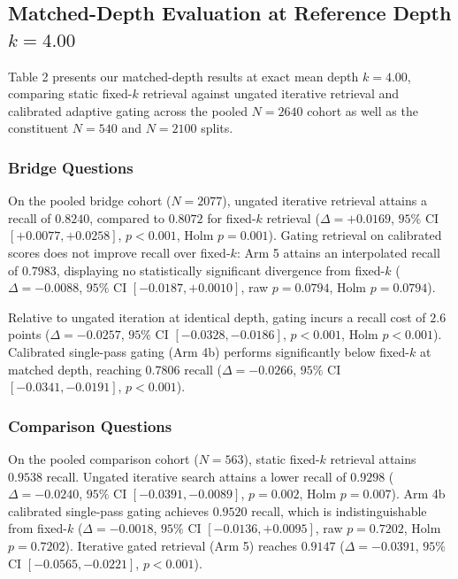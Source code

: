 \documentclass{article}
\begin{document}
\subsection{Matched-Depth Evaluation at Reference Depth $k=4.00$}
Table 2 presents our matched-depth results at exact mean depth $k=4.00$, comparing static fixed-$k$ retrieval against ungated iterative retrieval and calibrated adaptive gating across the pooled $N=2640$ cohort as well as the constituent $N=540$ and $N=2100$ splits.

\subsubsection{Bridge Questions}
On the pooled bridge cohort ($N=2077$), ungated iterative retrieval attains a recall of $0.8240$, compared to $0.8072$ for fixed-$k$ retrieval ($\Delta = +0.0169$, $95\%$ CI $[+0.0077, +0.0258]$, $p < 0.001$, Holm $p=0.001$). Gating retrieval on calibrated scores does not improve recall over fixed-$k$: Arm 5 attains an interpolated recall of $0.7983$, displaying no statistically significant divergence from fixed-$k$ ($\Delta = -0.0088$, $95\%$ CI $[-0.0187, +0.0010]$, raw $p = 0.0794$, Holm $p = 0.0794$).

Relative to ungated iteration at identical depth, gating incurs a recall cost of $2.6$ points ($\Delta = -0.0257$, $95\%$ CI $[-0.0328, -0.0186]$, $p < 0.001$, Holm $p < 0.001$). Calibrated single-pass gating (Arm 4b) performs significantly below fixed-$k$ at matched depth, reaching $0.7806$ recall ($\Delta = -0.0266$, $95\%$ CI $[-0.0341, -0.0191]$, $p < 0.001$).

\subsubsection{Comparison Questions}
On the pooled comparison cohort ($N=563$), static fixed-$k$ retrieval attains $0.9538$ recall. Ungated iterative search attains a lower recall of $0.9298$ ($\Delta = -0.0240$, $95\%$ CI $[-0.0391, -0.0089]$, $p = 0.002$, Holm $p=0.007$). Arm 4b calibrated single-pass gating achieves $0.9520$ recall, which is indistinguishable from fixed-$k$ ($\Delta = -0.0018$, $95\%$ CI $[-0.0136, +0.0095]$, raw $p = 0.7202$, Holm $p = 0.7202$). Iterative gated retrieval (Arm 5) reaches $0.9147$ ($\Delta = -0.0391$, $95\%$ CI $[-0.0565, -0.0221]$, $p < 0.001$).
\end{document}

